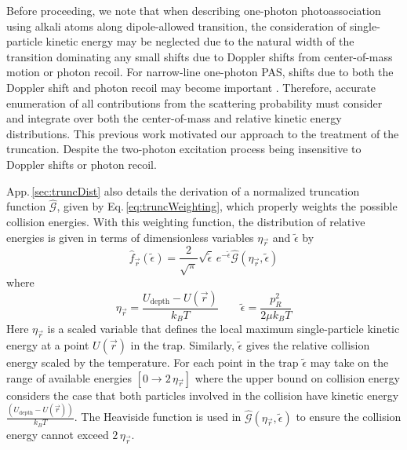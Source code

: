 Before proceeding, we note that when describing one-photon photoassociation using alkali atoms along dipole-allowed transition, the consideration of single-particle kinetic energy may be neglected due to the natural width of the transition dominating any small shifts due to Doppler shifts from center-of-mass motion or photon recoil.
For narrow-line one-photon PAS, shifts due to both the Doppler shift and photon recoil may become important \cite{Ciuryo2004, Borkowski2014a, Nicholson2015a, Reschovsky2018, Pachomov2017}.
Therefore, accurate enumeration of all contributions from the scattering probability must consider and integrate over both the center-of-mass and relative kinetic energy distributions.
This previous work motivated our approach to the treatment of the truncation.
Despite the two-photon excitation process being insensitive to Doppler shifts or photon recoil.



App.\,\ref{sec:truncDist} also details the derivation of a normalized truncation function $\hat{\mathcal{G}}$, given by Eq.\,\ref{eq:truncWeighting}, which properly weights the possible collision energies.
With this weighting function, the distribution of relative energies is given in terms of dimensionless variables $\eta_\vec{r}$ and $\tilde{\epsilon}$ by
\begin{equation} \label{eq:truncRelBolz}
	\hat{f}_{\vec{r}}(\tilde{\epsilon}) = \frac{2}{\sqrt{\pi}} \sqrt{\tilde{\epsilon}} \, e^{-\tilde{\epsilon}} \hat{\mathcal{G}}(\eta_{\vec{r}}, \tilde{\epsilon})
\end{equation}
where
\begin{equation}
	\eta_\vec{r} = \frac{U_\text{depth} - U(\vec{r})}{k_B T} \quad \quad \tilde{\epsilon} = \frac{p_{R}^2}{2 \mu k_B T} 
\end{equation}
Here $\eta_\vec{r}$ is a scaled variable that defines the local maximum single-particle kinetic energy at a point $U(\vec{r})$ in the trap.
Similarly, $\tilde{\epsilon}$ gives the relative collision energy scaled by the temperature.
For each point in the trap $\tilde{\epsilon}$ may take on the range of available energies $[ 0 \rightarrow 2\,\eta_\vec{r} ]$ where the upper bound on collision energy considers the case that both particles involved in the collision have kinetic energy $\displaystyle \frac{(U_\text{depth} - U(\vec{r}))}{k_B T}$.
The Heaviside function is used in $\hat{\mathcal{G}}(\eta_{\vec{r}}, \tilde{\epsilon})$ to ensure the collision energy cannot exceed $2\,\eta_\vec{r}$.

